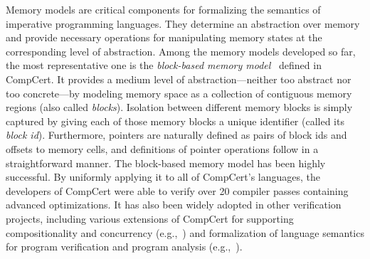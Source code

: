 Memory models are critical components for formalizing the semantics of
imperative programming languages. They determine an abstraction over
memory and provide necessary operations for manipulating memory states
at the corresponding level of abstraction.  Among the memory models
developed so far, the most representative one is the \emph{block-based
memory model}~\cite{leroy08,compcert-mem-v2} defined in CompCert.  It
provides a medium level of abstraction---neither too abstract nor too
concrete---by modeling memory space as a collection of contiguous
memory regions (also called \emph{blocks}). Isolation between
different memory blocks is simply captured by giving each of those
memory blocks a unique identifier (called its \emph{block
id}). Furthermore, pointers are naturally defined as pairs of block
ids and offsets to memory cells, and definitions of pointer operations
follow in a straightforward manner.  The block-based memory model has
been highly successful. By uniformly applying it to all of CompCert's
languages, the developers of CompCert were able to verify over 20
compiler passes containing advanced optimizations.  It has also been
widely adopted in other verification projects, including various
extensions of CompCert for supporting compositionality and concurrency
(e.g.,~\cite{sevcik13,SevcikVNJS11,stewart15,compcertm,cascompcert,wang2019,wang2020,hur16,compcerts})
and formalization of language semantics for program verification and
program analysis (e.g.,~\cite{appel11:vst,dscal15,ccal18}).

